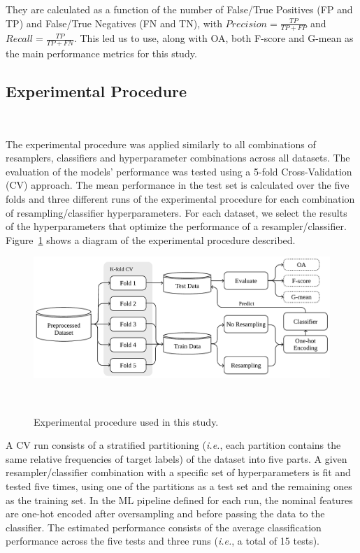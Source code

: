 They are calculated as a function of the number of False/True Positives (FP
and TP) and False/True Negatives (FN and TN), with $Precision =
\frac{TP}{TP+FP}$ and $Recall = \frac{TP}{TP+FN}$. This led us to use, along
with OA, both F-score and G-mean as the main performance metrics for this
study. 

\subsection{Experimental Procedure}~\label{sec:experimental_procedure-gsmotenc}

The experimental procedure was applied similarly to all combinations of
resamplers, classifiers and hyperparameter combinations across all datasets.
The evaluation of the models' performance was tested using a 5-fold
Cross-Validation (CV) approach. The mean performance in the test set is
calculated over the five folds and three different runs of the experimental
procedure for each combination of resampling/classifier hyperparameters. For
each dataset, we select the results of the hyperparameters that optimize the
performance of a resampler/classifier.
Figure~\ref{fig:experimental_procedure-gsmotenc}
shows a diagram of the experimental procedure described.

\begin{figure}
	\centering
	\includegraphics[width=.8\linewidth]{experimental_procedure}
    \caption{Experimental procedure used in this study.
    }~\label{fig:experimental_procedure-gsmotenc}
\end{figure}

A CV run consists of a stratified partitioning (\textit{i.e.}, each partition
contains the same relative frequencies of target labels) of the dataset into
five parts. A given resampler/classifier combination with a specific set of
hyperparameters is fit and tested five times, using one of the partitions as a
test set and the remaining ones as the training set. In the ML pipeline
defined for each run, the nominal features are one-hot encoded after
oversampling and before passing the data to the classifier. The estimated
performance consists of the average classification performance across the five
tests and three runs (\textit{i.e.}, a total of 15 tests). 

